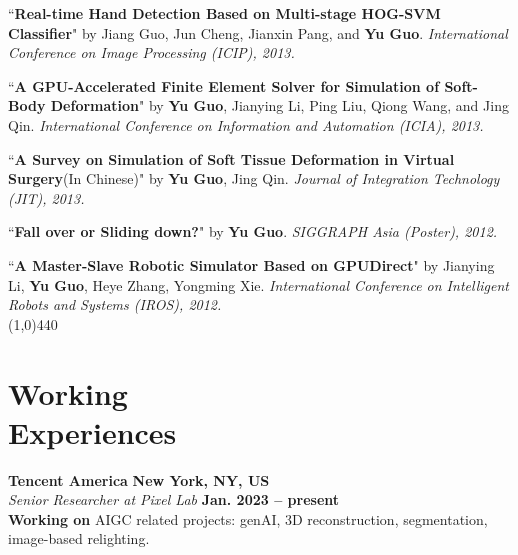 \documentclass[margin,line]{resume}
\begin{document}
\begin{resume}
    \vspace{-5mm}

    ``\textbf{Real-time Hand Detection Based on Multi-stage HOG-SVM Classifier}" 
    by Jiang Guo, Jun Cheng, Jianxin Pang, and \textbf{Yu Guo}. 
    \textsl{International Conference on Image Processing (ICIP), 2013.}\\

    \vspace{-5mm}

    ``\textbf{A GPU-Accelerated Finite Element Solver for Simulation of Soft-Body Deformation}" 
    by \textbf{Yu Guo}, Jianying Li, Ping Liu, Qiong Wang, and Jing Qin. 
    \textsl{International Conference on Information and Automation (ICIA), 2013.}\\

    \vspace{-5mm}

    ``\textbf{A Survey on Simulation of Soft Tissue Deformation in Virtual Surgery}(In Chinese)" 
    by \textbf{Yu Guo}, Jing Qin. 
    \textsl{Journal of Integration Technology (JIT), 2013.}\\

    \vspace{-5mm}

    ``\textbf{Fall over or Sliding down?}" 
    by \textbf{Yu Guo}.
    \textsl{SIGGRAPH Asia (Poster), 2012.}\\

    \vspace{-5mm}

    ``\textbf{A Master-Slave Robotic Simulator Based on GPUDirect}" 
    by Jianying Li, \textbf{Yu Guo}, Heye Zhang, Yongming Xie.
    \textsl{International Conference on Intelligent Robots and Systems (IROS), 2012.}\\


    \vspace{-5.0mm}
    \line(1,0){440}
    \vspace{-5.0mm}

    \section{\mysidestyle Working \\Experiences}

	\textbf{Tencent America} \hfill \textbf{New York, NY, US} \\
	\textsl{Senior Researcher at Pixel Lab} \hfill \textbf{Jan. 2023 -- present}\\
	\textbf{Working on} AIGC related projects: genAI, 3D reconstruction, segmentation, image-based relighting.\\


\end{resume}
\end{document}
